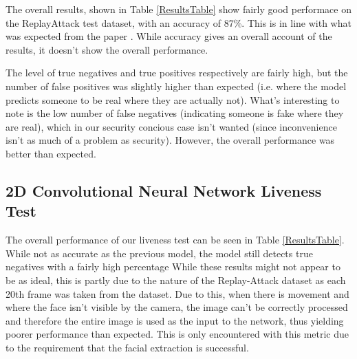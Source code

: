 \documentclass[10pt,a4paper]{article}
\begin{document}
        The overall results, shown in Table \ref{ResultsTable} show fairly good performace on the ReplayAttack test dataset, with an accuracy of 87\%. This is in line with
        what was expected from the paper \cite{ImageQualityAssessmentTest}. While accuracy gives an overall account of the results, it doesn't show the overall performance.
        
        The level of true negatives and true positives respectively are fairly high, but the number of false positives was slightly higher than expected (i.e. where the model predicts someone to be real where they are actually not).
        What's interesting to note is the low number of false negatives (indicating someone is fake where they are real), which in our security concious case isn't wanted (since inconvenience isn't as much of a problem as security).
        However, the overall performance was better than expected.

    \subsection{2D Convolutional Neural Network Liveness Test}
        The overall performance of our liveness test can be seen in Table \ref{ResultsTable}. While not as accurate as the previous model, the model still detects true negatives with a fairly high percentage
        While these results might not appear to be as ideal, this is partly due to the nature of the Replay-Attack dataset as each 20th frame was taken from the dataset.
        Due to this, when there is movement and where the face isn't visible by the camera, the image can't be correctly processed and therefore the entire image is used
        as the input to the network, thus yielding poorer performance than expected. This is only encountered with this metric due to the requirement that the facial extraction is successful. 
        
\end{document}
